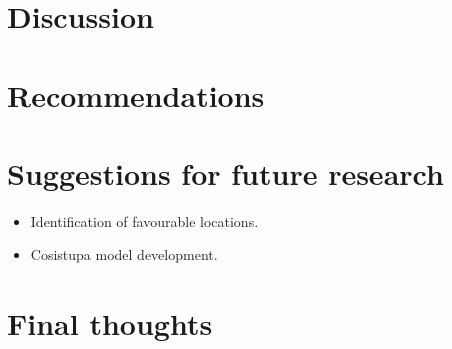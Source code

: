 \section{Discussion}

\section{Recommendations}

\section{Suggestions for future research}

\begin{itemize} 

\item Identification of favourable locations.

\item Cosistupa model development.

\end{itemize}

\section{Final thoughts}








